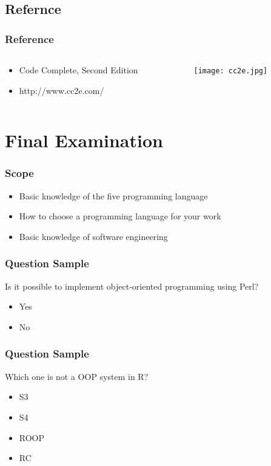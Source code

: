 \documentclass[UTF8]{beamer}
\begin{document}
\subsection{Refernce}
\begin{frame}
  \frametitle{Reference}
  \begin{columns}
    \begin{column}{.6\textwidth}
      \begin{itemize}
        \item Code Complete, Second Edition
        \item http://www.cc2e.com/
      \end{itemize}
    \end{column}
    \begin{column}{.4\textwidth}
      \texttt{[image: cc2e.jpg]}
    \end{column}
  \end{columns}
\end{frame}

\section{Final Examination}
\begin{frame}
  \frametitle{Scope}
  \begin{itemize}
    \item Basic knowledge of the five programming language
    \item How to choose a programming language for your work
    \item Basic knowledge of software engineering
  \end{itemize}
\end{frame}

\begin{frame}
  \frametitle{Question Sample}
  Is it possible to implement object-oriented programming using Perl?
  \begin{itemize}
    \item Yes
    \item No
  \end{itemize}
\end{frame}

\begin{frame}
  \frametitle{Question Sample}
  Which one is not a OOP system in R?
  \begin{itemize}
    \item S3
    \item S4
    \item ROOP
    \item RC
  \end{itemize}
\end{frame}
\end{document}

